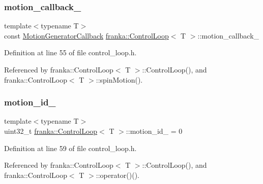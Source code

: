 \subsubsection{\texorpdfstring{motion\+\_\+callback\+\_\+}{motion\_callback\_}}
{\footnotesize\ttfamily template$<$typename T$>$ \\
const \hyperlink{classfranka_1_1ControlLoop_a23624d5a86fe2b206986af4757ba1822}{Motion\+Generator\+Callback} \hyperlink{classfranka_1_1ControlLoop}{franka\+::\+Control\+Loop}$<$ T $>$\+::motion\+\_\+callback\+\_\+\hspace{0.3cm}{\ttfamily [private]}}



Definition at line 55 of file control\+\_\+loop.\+h.



Referenced by franka\+::\+Control\+Loop$<$ T $>$\+::\+Control\+Loop(), and franka\+::\+Control\+Loop$<$ T $>$\+::spin\+Motion().

\mbox{\label{classfranka_1_1ControlLoop_a4dd139afcabc3a50bb9eb35ca44845fa}} 
\subsubsection{\texorpdfstring{motion\+\_\+id\+\_\+}{motion\_id\_}}
{\footnotesize\ttfamily template$<$typename T$>$ \\
uint32\+\_\+t \hyperlink{classfranka_1_1ControlLoop}{franka\+::\+Control\+Loop}$<$ T $>$\+::motion\+\_\+id\+\_\+ = 0\hspace{0.3cm}{\ttfamily [private]}}



Definition at line 59 of file control\+\_\+loop.\+h.



Referenced by franka\+::\+Control\+Loop$<$ T $>$\+::\+Control\+Loop(), and franka\+::\+Control\+Loop$<$ T $>$\+::operator()().

\mbox{\label{classfranka_1_1ControlLoop_aa618899fdcd85da8659fb3b1bd8c65b3}} 
